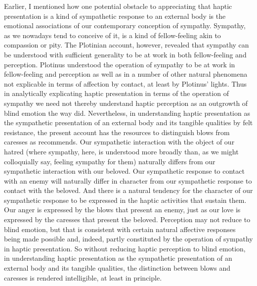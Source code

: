 Earlier, I mentioned how one potential obstacle to appreciating that haptic presentation is a kind of sympathetic response to an external body is the emotional associations of our contemporary conception of sympathy. Sympathy, as we nowadays tend to conceive of it, is a kind of fellow-feeling akin to compassion or pity. The Plotinian account, however, revealed that sympathy can be understood with sufficient generality to be at work in both fellow-feeling and perception. Plotinus understood the operation of sympathy to be at work in fellow-feeling and perception as well as in a number of other natural phenomena not explicable in terms of affection by contact, at least by Plotinus' lights. Thus in analytically explicating haptic presentation in terms of the operation of sympathy we need not thereby understand haptic perception as an outgrowth of blind emotion the way \citet[162--3]{Whitehead:1978zr} did. Nevertheless, in understanding haptic presentation as the sympathetic presentation of an external body and its tangible qualities by felt resistance, the present account has the resources to distinguish blows from caresses as \citet{Derrida:2005aa} recommends. Our sympathetic interaction with the object of our hatred (where sympathy, here, is understood more broadly than, as we might colloquially say, feeling sympathy for them) naturally differs from our sympathetic interaction with our beloved. Our sympathetic response to contact with an enemy will naturally differ in character from our sympathetic response to contact with the beloved. And there is a natural tendency for the character of our sympathetic response to be expressed in the haptic activities that sustain them. Our anger is expressed by the blows that present an enemy, just as our love is expressed by the caresses that present the beloved. Perception may not reduce to blind emotion, but that is consistent with certain natural affective responses being made possible and, indeed, partly constituted by the operation of sympathy in haptic presentation. So without reducing haptic perception to blind emotion, in understanding haptic presentation as the sympathetic presentation of an external body and its tangible qualities, the distinction between blows and caresses is rendered intelligible, at least in principle.

